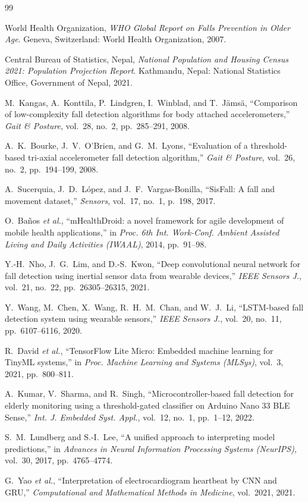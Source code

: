 \begin{thebibliography}{99}

World Health Organization, \textit{WHO Global Report on Falls Prevention in Older Age}. Geneva, Switzerland: World Health Organization, 2007.

Central Bureau of Statistics, Nepal, \textit{National Population and Housing Census 2021: Population Projection Report}. Kathmandu, Nepal: National Statistics Office, Government of Nepal, 2021.

M.~Kangas, A.~Konttila, P.~Lindgren, I.~Winblad, and T.~J{\"a}ms{\"a}, ``Comparison of low-complexity fall detection algorithms for body attached accelerometers,'' \textit{Gait \& Posture}, vol.~28, no.~2, pp.~285--291, 2008.

A.~K.~Bourke, J.~V.~O'Brien, and G.~M.~Lyons, ``Evaluation of a threshold-based tri-axial accelerometer fall detection algorithm,'' \textit{Gait \& Posture}, vol.~26, no.~2, pp.~194--199, 2008.

A.~Sucerquia, J.~D.~L{\'o}pez, and J.~F.~Vargas-Bonilla, ``SisFall: A fall and movement dataset,'' \textit{Sensors}, vol.~17, no.~1, p.~198, 2017.

O.~Ba{\~n}os \textit{et al.}, ``mHealthDroid: a novel framework for agile development of mobile health applications,'' in \textit{Proc. 6th Int. Work-Conf. Ambient Assisted Living and Daily Activities (IWAAL)}, 2014, pp.~91--98.

Y.-H.~Nho, J.~G.~Lim, and D.-S.~Kwon, ``Deep convolutional neural network for fall detection using inertial sensor data from wearable devices,'' \textit{IEEE Sensors J.}, vol.~21, no.~22, pp.~26305--26315, 2021.

Y.~Wang, M.~Chen, X.~Wang, R.~H.~M.~Chan, and W.~J.~Li, ``LSTM-based fall detection system using wearable sensors,'' \textit{IEEE Sensors J.}, vol.~20, no.~11, pp.~6107--6116, 2020.

R.~David \textit{et al.}, ``TensorFlow Lite Micro: Embedded machine learning for TinyML systems,'' in \textit{Proc. Machine Learning and Systems (MLSys)}, vol.~3, 2021, pp.~800--811.

A.~Kumar, V.~Sharma, and R.~Singh, ``Microcontroller-based fall detection for elderly monitoring using a threshold-gated classifier on Arduino Nano 33 BLE Sense,'' \textit{Int. J. Embedded Syst. Appl.}, vol.~12, no.~1, pp.~1--12, 2022.

S.~M.~Lundberg and S.-I.~Lee, ``A unified approach to interpreting model predictions,'' in \textit{Advances in Neural Information Processing Systems (NeurIPS)}, vol.~30, 2017, pp.~4765--4774.

G.~Yao \textit{et al.}, ``Interpretation of electrocardiogram heartbeat by CNN and GRU,'' \textit{Computational and Mathematical Methods in Medicine}, vol.~2021, 2021.

\end{thebibliography}
